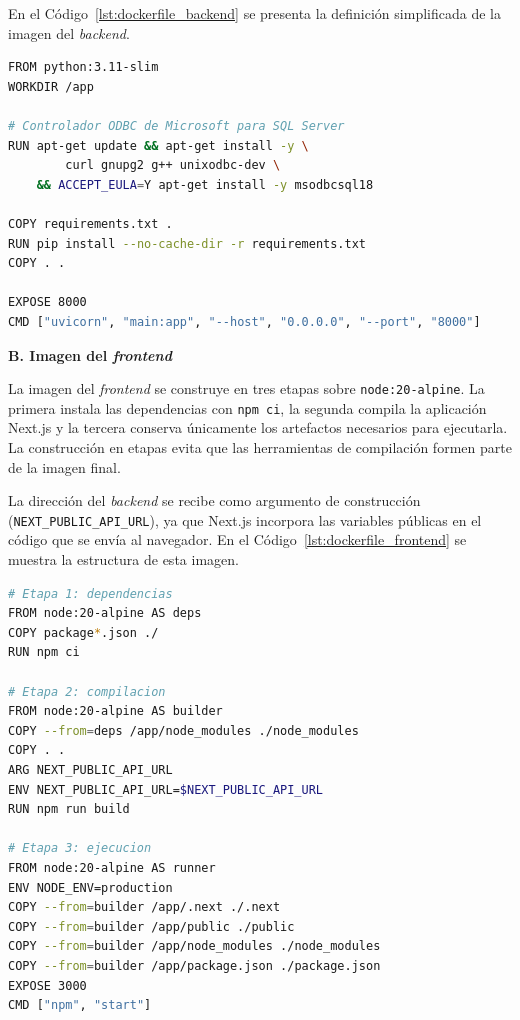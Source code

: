 En el Código~\ref{lst:dockerfile_backend} se presenta la definición simplificada de la imagen del \textit{backend}.

\begin{lstlisting}[language=bash, caption={Definición simplificada de la imagen del backend}, label={lst:dockerfile_backend}]
FROM python:3.11-slim
WORKDIR /app

# Controlador ODBC de Microsoft para SQL Server
RUN apt-get update && apt-get install -y \
        curl gnupg2 g++ unixodbc-dev \
    && ACCEPT_EULA=Y apt-get install -y msodbcsql18

COPY requirements.txt .
RUN pip install --no-cache-dir -r requirements.txt
COPY . .

EXPOSE 8000
CMD ["uvicorn", "main:app", "--host", "0.0.0.0", "--port", "8000"]
\end{lstlisting}

\textbf{B. Imagen del \textit{frontend}}

La imagen del \textit{frontend} se construye en tres etapas sobre \texttt{node:20-alpine}. La primera instala las dependencias con \texttt{npm ci}, la segunda compila la aplicación Next.js \cite{nextjsDocs} y la tercera conserva únicamente los artefactos necesarios para ejecutarla. La construcción en etapas evita que las herramientas de compilación formen parte de la imagen final.

La dirección del \textit{backend} se recibe como argumento de construcción (\texttt{NEXT\_PUBLIC\_API\_URL}), ya que Next.js incorpora las variables públicas en el código que se envía al navegador. En el Código~\ref{lst:dockerfile_frontend} se muestra la estructura de esta imagen.

\begin{lstlisting}[language=bash, caption={Construcción en etapas de la imagen del frontend}, label={lst:dockerfile_frontend}]
# Etapa 1: dependencias
FROM node:20-alpine AS deps
COPY package*.json ./
RUN npm ci

# Etapa 2: compilacion
FROM node:20-alpine AS builder
COPY --from=deps /app/node_modules ./node_modules
COPY . .
ARG NEXT_PUBLIC_API_URL
ENV NEXT_PUBLIC_API_URL=$NEXT_PUBLIC_API_URL
RUN npm run build

# Etapa 3: ejecucion
FROM node:20-alpine AS runner
ENV NODE_ENV=production
COPY --from=builder /app/.next ./.next
COPY --from=builder /app/public ./public
COPY --from=builder /app/node_modules ./node_modules
COPY --from=builder /app/package.json ./package.json
EXPOSE 3000
CMD ["npm", "start"]
\end{lstlisting}

